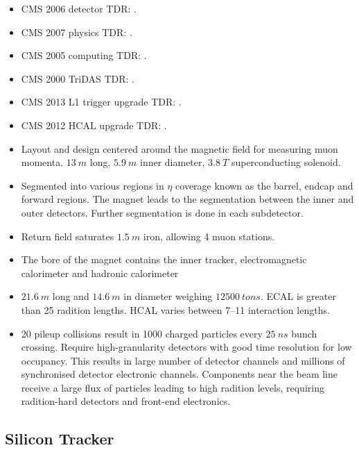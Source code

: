 \begin{itemize}
    \item CMS 2006 detector TDR: \cite{Bayatian:922757}.
    \item CMS 2007 physics TDR: \cite{Bayatian:942733}.
    \item CMS 2005 computing TDR: \cite{Bayatyan:838359}.
    \item CMS 2000 TriDAS TDR: \cite{Bayatyan:706847}.
    \item CMS 2013 L1 trigger upgrade TDR: \cite{Tapper:1556311}.
    \item CMS 2012 HCAL upgrade TDR: \cite{Mans:1481837}.
    \item Layout and design centered around the magnetic field for measuring
        muon momenta. ${\SI{13}{m}}$ long, ${\SI{5.9}{m}}$ inner diameter,
        ${\SI{3.8}{T}}$ superconducting solenoid.
    \item Segmented into various regions in $\eta$ coverage known as the barrel,
        endcap and forward regions. The magnet leads to the segmentation between
        the inner and outer detectors. Further segmentation is done in each
        subdetector.
    \item Return field saturates ${\SI{1.5}{m}}$ iron, allowing 4 muon stations.
    \item The bore of the magnet contains the inner tracker, electromagnetic
        calorimeter and hadronic calorimeter
    \item ${\SI{21.6}{m}}$ long and ${\SI{14.6}{m}}$ in diameter weighing
        ${\SI{12500}{tons}}$. ECAL is greater than 25 radition lengths. HCAL
        varies between 7--11 interaction lengths.
    \item 20 pileup collisions result in 1000 charged particles every
        ${\SI{25}{ns}}$ bunch crossing. Require high-granularity detectors
        with good time resolution for low occupancy. This results in large
        number of detector channels and millions of synchronised detector
        electronic channels. Components near the beam line receive a large
        flux of particles leading to high radition levels, requiring
        radition-hard detectors and front-end electronics.
\end{itemize}

\subsection{Silicon Tracker}


